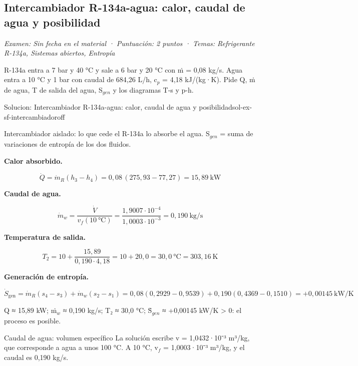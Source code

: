 \documentclass[11pt,a4paper]{article}
\begin{document}
\subsection{Intercambiador R-134a-agua: calor, caudal de agua y posibilidad}
\noindent\textit{Examen: Sin fecha en el material · Puntuación: 2 puntos · Temas: Refrigerante R-134a, Sistemas abiertos, Entropía}\par\medskip

R-134a entra a 7 bar y 40 °C y sale a 6 bar y 20 °C con ṁ = 0,08 kg/s. Agua entra a 10 °C y 1 bar con caudal de 684,26 L/h, c$_{p}$ = 4,18 kJ/(kg·K). Pide Q, ṁ de agua, T de salida del agua, S$_{gen}$ y los diagramas T-s y p-h.

\begin{ocg}{Solucion: Intercambiador R-134a-agua: calor, caudal de agua y posibilidad}{sol-ex-sf-intercambiador}{off}
\begin{antesbox}
Intercambiador aislado: lo que cede el R-134a lo absorbe el agua. S$_{gen}$ = suma de variaciones de entropía de los dos fluidos.
\end{antesbox}

\par\medskip\noindent\textbf{Calor absorbido.}\par
\[\dot Q = \dot m_R(h_3 - h_4) = 0{,}08\,(275{,}93 - 77{,}27) = 15{,}89\ \text{kW}\]

\par\medskip\noindent\textbf{Caudal de agua.}\par
\[\dot m_w = \frac{\dot V}{v_f(10\ \text{°C})} = \frac{1{,}9007\cdot 10^{-4}}{1{,}0003\cdot 10^{-3}} = 0{,}190\ \text{kg/s}\]

\par\medskip\noindent\textbf{Temperatura de salida.}\par
\[T_2 = 10 + \frac{15{,}89}{0{,}190\cdot 4{,}18} = 10 + 20{,}0 = 30{,}0\ \text{°C} = 303{,}16\ \text{K}\]

\par\medskip\noindent\textbf{Generación de entropía.}\par
\[\dot S_{\text{gen}} = \dot m_R(s_4 - s_3) + \dot m_w(s_2 - s_1) = 0{,}08(0{,}2929 - 0{,}9539) + 0{,}190(0{,}4369 - 0{,}1510) = +0{,}00145\ \text{kW/K}\]

\begin{resbox}
Q ≈ 15,89 kW; ṁ$_{w}$ ≈ 0,190 kg/s; T₂ ≈ 30,0 °C; Ṡ$_{gen}$ ≈ +0,00145 kW/K > 0: el proceso es posible.
\end{resbox}

\begin{ojobox}{Caudal de agua: volumen específico}
La solución escribe v = 1,0432·10⁻³ m³/kg, que corresponde a agua a unos 100 °C. A 10 °C, v$_{f}$ = 1,0003·10⁻³ m³/kg, y el caudal es 0,190 kg/s.
\end{ojobox}


\end{ocg}
\end{document}
